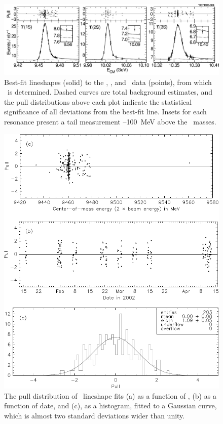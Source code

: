 \documentclass{cornell}
\begin{document}
\begin{figure}[p]
  \begin{center}
    \includegraphics[width=\linewidth]{plots/fitresults}
  \end{center}
  \caption{\label{fitresults} Best-fit lineshapes (solid) to the \us,
  \uss, and \usss\ data (points), from which \geehadtot\ is
  determined.  Dashed curves are total background estimates, and the
  pull distributions above each plot indicate the statistical
  significance of all deviations from the best-fit line.  Insets for
  each resonance present a tail measurement \bork--100~MeV above the
  \ups\ masses.}
\end{figure}

\begin{figure}[p]
  \begin{center}
    \includegraphics[width=\linewidth]{plots/pullsone}
  \end{center}
  \caption{\label{pullsone} The pull distribution of \us\ lineshape
  fits (a) as a function of \ecm, (b) as a function of date, and (c),
  as a histogram, fitted to a Gaussian curve, which is almost two
  standard deviations wider than unity.}
\end{figure}
\end{document}
